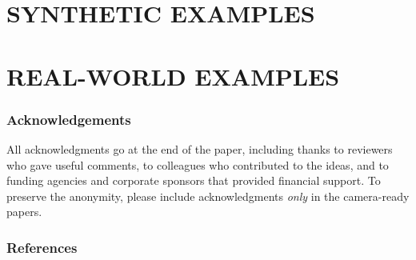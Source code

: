 \documentclass[twoside]{article}
\begin{document}
\section{SYNTHETIC EXAMPLES}

\section{REAL-WORLD EXAMPLES}


\subsubsection*{Acknowledgements}
All acknowledgments go at the end of the paper, including thanks to reviewers who gave useful comments, to colleagues who contributed to the ideas, and to funding agencies and corporate sponsors that provided financial support. 
To preserve the anonymity, please include acknowledgments \emph{only} in the camera-ready papers.

\subsubsection*{References}


\end{document}
